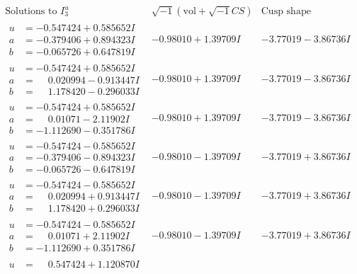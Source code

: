 \documentclass[1p]{elsarticle_modified}
\theoremstyle{definition}
\newcommand{\I}{\sqrt{-1}}
\begin{document}
$$\begin{array}{c|c|c}  
\text{Solutions to }I^u_{3}& \I (\text{vol} + \sqrt{-1}CS) & \text{Cusp shape}\\
 \hline 
\begin{aligned}
u &= -0.547424 + 0.585652 I \\
a &= -0.379406 + 0.894323 I \\
b &= -0.065726 + 0.647819 I\end{aligned}
 & -0.98010 + 1.39709 I & -3.77019 - 3.86736 I \\ \hline\begin{aligned}
u &= -0.547424 + 0.585652 I \\
a &= \phantom{-}0.020994 - 0.913447 I \\
b &= \phantom{-}1.178420 - 0.296033 I\end{aligned}
 & -0.98010 + 1.39709 I & -3.77019 - 3.86736 I \\ \hline\begin{aligned}
u &= -0.547424 + 0.585652 I \\
a &= \phantom{-}0.01071 - 2.11902 I \\
b &= -1.112690 - 0.351786 I\end{aligned}
 & -0.98010 + 1.39709 I & -3.77019 - 3.86736 I \\ \hline\begin{aligned}
u &= -0.547424 - 0.585652 I \\
a &= -0.379406 - 0.894323 I \\
b &= -0.065726 - 0.647819 I\end{aligned}
 & -0.98010 - 1.39709 I & -3.77019 + 3.86736 I \\ \hline\begin{aligned}
u &= -0.547424 - 0.585652 I \\
a &= \phantom{-}0.020994 + 0.913447 I \\
b &= \phantom{-}1.178420 + 0.296033 I\end{aligned}
 & -0.98010 - 1.39709 I & -3.77019 + 3.86736 I \\ \hline\begin{aligned}
u &= -0.547424 - 0.585652 I \\
a &= \phantom{-}0.01071 + 2.11902 I \\
b &= -1.112690 + 0.351786 I\end{aligned}
 & -0.98010 - 1.39709 I & -3.77019 + 3.86736 I \\ \hline\begin{aligned}
u &= \phantom{-}0.547424 + 1.120870 I \\

\end{aligned}
\end{array}$$
\end{document}
